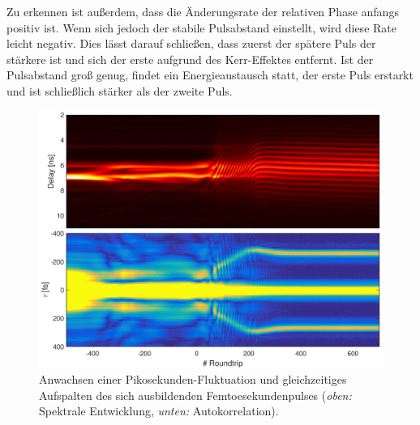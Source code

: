 \documentclass[bachelor,       %
               twoside,        %
               BCOR10mm,       %
               liststotoc,nomtotoc,bibtotoc, %
               english,ngerman, %
               final,          %
               ]{GAUBM}
\begin{document}
Zu erkennen ist außerdem, dass die Änderungsrate der relativen Phase anfangs positiv ist. Wenn sich jedoch der stabile Pulsabstand einstellt, wird diese Rate leicht negativ.
Dies lässt darauf schließen, dass zuerst der spätere Puls der stärkere ist und sich der erste aufgrund des Kerr-Effektes entfernt.
Ist der Pulsabstand groß genug, findet ein Energieaustausch statt, der erste Puls erstarkt und ist schließlich stärker als der zweite Puls. 
\begin{figure}[!htb]
   \centering
   \includegraphics[width=\textwidth]{figures/4ms_25GSA_400m_Mlstart_Doppelpulse4_Splitting_93800}
   \caption{Anwachsen einer Pikosekunden-Fluktuation und gleichzeitiges Aufspalten des sich ausbildenden Femtoesekundenpulses (\textit{oben:} Spektrale Entwicklung, \textit{unten:} Autokorrelation).}
   \label{fig:Splitting}
\end{figure}

\clearpage
\end{document}
